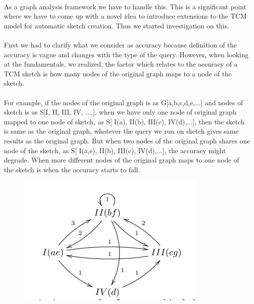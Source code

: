 \documentclass[12pt]{report}
\numberwithin{figure}{section}
\numberwithin{table}{section}
\begin{document}
\paragraph{}

As a graph analysis framework we have to handle this. This is a significant point where we have to come up with a novel idea to introduce extensions to the TCM model for automatic sketch creation. Thus we started investigation on this.

\paragraph{}

First we had to clarify what we consider as accuracy because definition of the accuracy is vague and changes with the type of the query. However, when looking at the fundamentals, we realized, the factor which relates to the accuracy of a TCM sketch is how many nodes of the original graph maps to a node of the sketch.

\paragraph{}

 For example, if the nodes of the original graph is as G[a,b,c,d,e,...] and nodes of sketch is as S[I, II, III, IV, ...,], when  we have only one node of original graph mapped to one node of sketch, as S[ I(a), II(b), III(c), IV(d),...], then the sketch is same as the original graph, whatever the query we run on sketch gives same results as the original graph. But when two nodes of the original graph shares one node of the sketch, as S[ I(a,e), II(b), III(c), IV(d),...], the accuracy might degrade. When more different nodes of the original graph maps to one node of the sketch is when the accuracy starts to fall.
 
\begin{figure}[H]
\centering
\includegraphics[scale=0.6]{images/example-tcm}
\end{figure}
\end{document}
